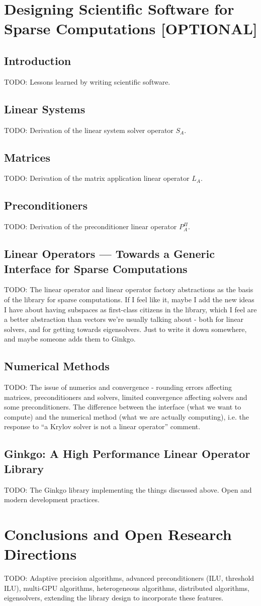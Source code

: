 \section{Designing Scientific Software for Sparse Computations [OPTIONAL]}
\subsection{Introduction}
TODO: Lessons learned by writing scientific software.
\subsection{Linear Systems}
TODO: Derivation of the linear system solver operator $S_A$.
\subsection{Matrices}
TODO: Derivation of the matrix application linear operator $L_A$.
\subsection{Preconditioners}
TODO: Derivation of the preconditioner linear operator $P^\Pi_A$.
\subsection{Linear Operators --- Towards a Generic Interface for Sparse
            Computations}
TODO: The linear operator and linear operator factory abstractions as the basis
      of the library for sparse computations.
      If I feel like it, maybe I add the new ideas I have about having subspaces
      as first-class citizens in the library, which I feel are a better
      abstraction than vectors we're usually talking about - both for linear
      solvers, and for getting towards eigensolvers. Just to write it down
      somewhere, and maybe someone adds them to Ginkgo.
\subsection{Numerical Methods}
TODO: The issue of numerics and convergence - rounding errors affecting
matrices, preconditioners and solvers, limited convergence affecting solvers and
some preconditioners. The difference between the interface (what we want to
compute) and the numerical method (what we are actually computing), i.e. the
response to ``a Krylov solver is not a linear operator'' comment.

\subsection{Ginkgo: A High Performance Linear Operator Library}
TODO: The Ginkgo library implementing the things discussed above. Open and
modern development practices.

\section{Conclusions and Open Research Directions}
TODO: Adaptive precision algorithms, advanced preconditioners (ILU, threshold
ILU), multi-GPU algorithms, heterogeneous algorithms, distributed algorithms,
eigensolvers, extending the library design to incorporate these features.
